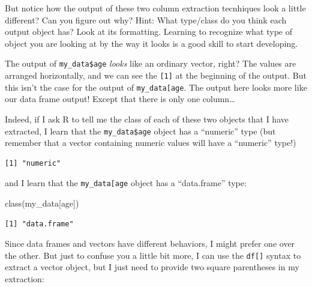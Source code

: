 \documentclass[
  letterpaper,
  DIV=11,
  numbers=noendperiod]{scrreprt}
\newenvironment{Shaded}{\begin{snugshade}}{\end{snugshade}}
\newcommand{\FunctionTok}[1]{\textcolor[rgb]{0.28,0.35,0.67}{#1}}
\newcommand{\NormalTok}[1]{\textcolor[rgb]{0.00,0.23,0.31}{#1}}
\newcommand{\SpecialCharTok}[1]{\textcolor[rgb]{0.37,0.37,0.37}{#1}}
\newcommand{\StringTok}[1]{\textcolor[rgb]{0.13,0.47,0.30}{#1}}
\begin{document}
But notice how the output of these two column extraction tecnhiques look
a little different? Can you figure out why? Hint: What type/class do you
think each output object has? Look at its formatting. Learning to
recognize what type of object you are looking at by the way it looks is
a good skill to start developing.

The output of \texttt{my\_data\$age} \emph{looks} like an ordinary
vector, right? The values are arranged horizontally, and we can see the
\texttt{{[}1{]}} at the beginning of the output. But this isn't the case
for the output of
\texttt{my\_data{[}\textquotesingle{}age\textquotesingle{}{]}}. The
output here looks more like our data frame output! Except that there is
only one column\ldots{}

Indeed, if I ask R to tell me the class of each of these two objects
that I have extracted, I learn that the \texttt{my\_data\$age} object
has a ``numeric'' type (but remember that a vector containing numeric
values will have a ``numeric'' type!)

\begin{Shaded}
\end{Shaded}

\begin{verbatim}
[1] "numeric"
\end{verbatim}

and I learn that the
\texttt{my\_data{[}\textquotesingle{}age\textquotesingle{}{]}} object
has a ``data.frame'' type:

\begin{Shaded}
\begin{Highlighting}[]
\FunctionTok{class}\NormalTok{(my\_data[}\StringTok{\textquotesingle{}age\textquotesingle{}}\NormalTok{])}
\end{Highlighting}
\end{Shaded}

\begin{verbatim}
[1] "data.frame"
\end{verbatim}

Since data frames and vectors have different behaviors, I might prefer
one over the other. But just to confuse you a little bit more, I can use
the \texttt{df{[}{]}} syntax to extract a vector object, but I just need
to provide two square parentheses in my extraction:
\end{document}
